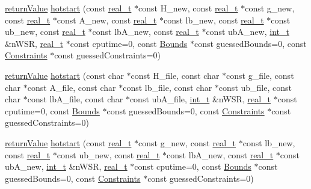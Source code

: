 \begin{DoxyCompactItemize}
\item 
\hyperlink{_message_handling_8hpp_a81d556f613bfbabd0b1f9488c0fa865e}{return\+Value} \hyperlink{class_s_q_problem_a827051abcd3e9c47834904b1be2c7536}{hotstart} (const \hyperlink{qp_o_a_s_e_s__wrapper_8h_a0d00e2b3dfadee81331bbb39068570c4}{real\+\_\+t} $\ast$const H\+\_\+new, const \hyperlink{qp_o_a_s_e_s__wrapper_8h_a0d00e2b3dfadee81331bbb39068570c4}{real\+\_\+t} $\ast$const g\+\_\+new, const \hyperlink{qp_o_a_s_e_s__wrapper_8h_a0d00e2b3dfadee81331bbb39068570c4}{real\+\_\+t} $\ast$const A\+\_\+new, const \hyperlink{qp_o_a_s_e_s__wrapper_8h_a0d00e2b3dfadee81331bbb39068570c4}{real\+\_\+t} $\ast$const lb\+\_\+new, const \hyperlink{qp_o_a_s_e_s__wrapper_8h_a0d00e2b3dfadee81331bbb39068570c4}{real\+\_\+t} $\ast$const ub\+\_\+new, const \hyperlink{qp_o_a_s_e_s__wrapper_8h_a0d00e2b3dfadee81331bbb39068570c4}{real\+\_\+t} $\ast$const lb\+A\+\_\+new, const \hyperlink{qp_o_a_s_e_s__wrapper_8h_a0d00e2b3dfadee81331bbb39068570c4}{real\+\_\+t} $\ast$const ub\+A\+\_\+new, \hyperlink{_types_8hpp_ab6fd6105e64ed14a0c9281326f05e623}{int\+\_\+t} \&n\+W\+SR, \hyperlink{qp_o_a_s_e_s__wrapper_8h_a0d00e2b3dfadee81331bbb39068570c4}{real\+\_\+t} $\ast$const cputime=0, const \hyperlink{class_bounds}{Bounds} $\ast$const guessed\+Bounds=0, const \hyperlink{class_constraints}{Constraints} $\ast$const guessed\+Constraints=0)
\item 
\hyperlink{_message_handling_8hpp_a81d556f613bfbabd0b1f9488c0fa865e}{return\+Value} \hyperlink{class_s_q_problem_ad7e067839ba217f613e4d3199e3fbb8a}{hotstart} (const char $\ast$const H\+\_\+file, const char $\ast$const g\+\_\+file, const char $\ast$const A\+\_\+file, const char $\ast$const lb\+\_\+file, const char $\ast$const ub\+\_\+file, const char $\ast$const lb\+A\+\_\+file, const char $\ast$const ub\+A\+\_\+file, \hyperlink{_types_8hpp_ab6fd6105e64ed14a0c9281326f05e623}{int\+\_\+t} \&n\+W\+SR, \hyperlink{qp_o_a_s_e_s__wrapper_8h_a0d00e2b3dfadee81331bbb39068570c4}{real\+\_\+t} $\ast$const cputime=0, const \hyperlink{class_bounds}{Bounds} $\ast$const guessed\+Bounds=0, const \hyperlink{class_constraints}{Constraints} $\ast$const guessed\+Constraints=0)
\item 
\hyperlink{_message_handling_8hpp_a81d556f613bfbabd0b1f9488c0fa865e}{return\+Value} \hyperlink{class_s_q_problem_aa7fa34b04b65e38a95032170a562b566}{hotstart} (const \hyperlink{qp_o_a_s_e_s__wrapper_8h_a0d00e2b3dfadee81331bbb39068570c4}{real\+\_\+t} $\ast$const g\+\_\+new, const \hyperlink{qp_o_a_s_e_s__wrapper_8h_a0d00e2b3dfadee81331bbb39068570c4}{real\+\_\+t} $\ast$const lb\+\_\+new, const \hyperlink{qp_o_a_s_e_s__wrapper_8h_a0d00e2b3dfadee81331bbb39068570c4}{real\+\_\+t} $\ast$const ub\+\_\+new, const \hyperlink{qp_o_a_s_e_s__wrapper_8h_a0d00e2b3dfadee81331bbb39068570c4}{real\+\_\+t} $\ast$const lb\+A\+\_\+new, const \hyperlink{qp_o_a_s_e_s__wrapper_8h_a0d00e2b3dfadee81331bbb39068570c4}{real\+\_\+t} $\ast$const ub\+A\+\_\+new, \hyperlink{_types_8hpp_ab6fd6105e64ed14a0c9281326f05e623}{int\+\_\+t} \&n\+W\+SR, \hyperlink{qp_o_a_s_e_s__wrapper_8h_a0d00e2b3dfadee81331bbb39068570c4}{real\+\_\+t} $\ast$const cputime=0, const \hyperlink{class_bounds}{Bounds} $\ast$const guessed\+Bounds=0, const \hyperlink{class_constraints}{Constraints} $\ast$const guessed\+Constraints=0)

\end{DoxyCompactItemize}
